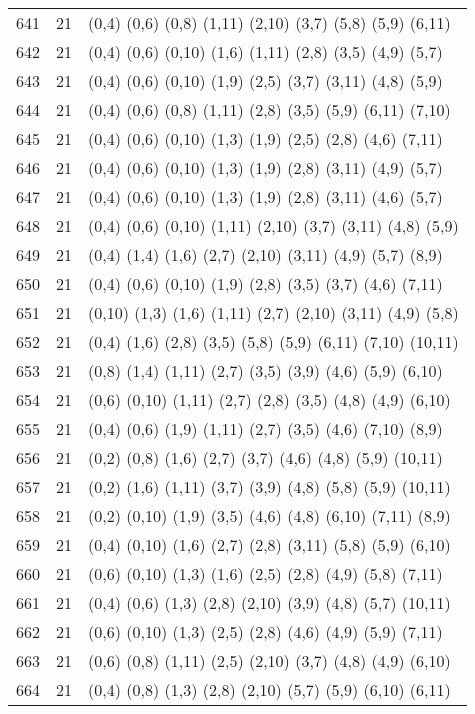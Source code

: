 {\begin{longtable}{lll}
641 & 21 & (0,4) (0,6) (0,8) (1,11) (2,10) (3,7) (5,8) (5,9) (6,11) \\
642 & 21 & (0,4) (0,6) (0,10) (1,6) (1,11) (2,8) (3,5) (4,9) (5,7) \\
643 & 21 & (0,4) (0,6) (0,10) (1,9) (2,5) (3,7) (3,11) (4,8) (5,9) \\
644 & 21 & (0,4) (0,6) (0,8) (1,11) (2,8) (3,5) (5,9) (6,11) (7,10) \\
645 & 21 & (0,4) (0,6) (0,10) (1,3) (1,9) (2,5) (2,8) (4,6) (7,11) \\
646 & 21 & (0,4) (0,6) (0,10) (1,3) (1,9) (2,8) (3,11) (4,9) (5,7) \\
647 & 21 & (0,4) (0,6) (0,10) (1,3) (1,9) (2,8) (3,11) (4,6) (5,7) \\
648 & 21 & (0,4) (0,6) (0,10) (1,11) (2,10) (3,7) (3,11) (4,8) (5,9) \\
649 & 21 & (0,4) (1,4) (1,6) (2,7) (2,10) (3,11) (4,9) (5,7) (8,9) \\
650 & 21 & (0,4) (0,6) (0,10) (1,9) (2,8) (3,5) (3,7) (4,6) (7,11) \\
651 & 21 & (0,10) (1,3) (1,6) (1,11) (2,7) (2,10) (3,11) (4,9) (5,8) \\
652 & 21 & (0,4) (1,6) (2,8) (3,5) (5,8) (5,9) (6,11) (7,10) (10,11) \\
653 & 21 & (0,8) (1,4) (1,11) (2,7) (3,5) (3,9) (4,6) (5,9) (6,10) \\
654 & 21 & (0,6) (0,10) (1,11) (2,7) (2,8) (3,5) (4,8) (4,9) (6,10) \\
655 & 21 & (0,4) (0,6) (1,9) (1,11) (2,7) (3,5) (4,6) (7,10) (8,9) \\
656 & 21 & (0,2) (0,8) (1,6) (2,7) (3,7) (4,6) (4,8) (5,9) (10,11) \\
657 & 21 & (0,2) (1,6) (1,11) (3,7) (3,9) (4,8) (5,8) (5,9) (10,11) \\
658 & 21 & (0,2) (0,10) (1,9) (3,5) (4,6) (4,8) (6,10) (7,11) (8,9) \\
659 & 21 & (0,4) (0,10) (1,6) (2,7) (2,8) (3,11) (5,8) (5,9) (6,10) \\
660 & 21 & (0,6) (0,10) (1,3) (1,6) (2,5) (2,8) (4,9) (5,8) (7,11) \\
661 & 21 & (0,4) (0,6) (1,3) (2,8) (2,10) (3,9) (4,8) (5,7) (10,11) \\
662 & 21 & (0,6) (0,10) (1,3) (2,5) (2,8) (4,6) (4,9) (5,9) (7,11) \\
663 & 21 & (0,6) (0,8) (1,11) (2,5) (2,10) (3,7) (4,8) (4,9) (6,10) \\
664 & 21 & (0,4) (0,8) (1,3) (2,8) (2,10) (5,7) (5,9) (6,10) (6,11) \\

\end{longtable}}
